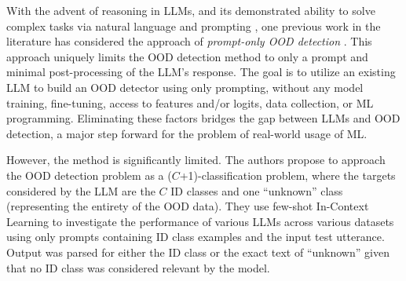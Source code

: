 With the advent of reasoning in LLMs, and its demonstrated ability to solve complex tasks via natural language and prompting \cite{kumar2025llm,zhang2022automatic,dong2024survey}, one previous work in the literature has considered the approach of \textit{prompt-only OOD detection} \cite{wang2024beyond}. This approach uniquely limits the OOD detection method to only a prompt and minimal post-processing of the LLM's response. The goal is to utilize an existing LLM to build an OOD detector using only prompting, without any model training, fine-tuning, access to features and/or logits, data collection, or ML programming. Eliminating these factors bridges the gap between LLMs and OOD detection, a major step forward for the problem of real-world usage of ML.

However, the method is significantly limited. The authors propose to approach the OOD detection problem as a ($C$+1)-classification problem, where the targets considered by the LLM are the $C$ ID classes and one ``unknown'' class (representing the entirety of the OOD data). They use few-shot In-Context Learning \cite{dong2024survey} to investigate the performance of various LLMs across various datasets using only prompts containing ID class examples and the input test utterance. Output was parsed for either the ID class or the exact text of ``unknown'' given that no ID class was considered relevant by the model.

